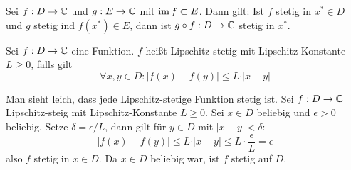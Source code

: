 \begin{satz}
    Sei $f:D\to \mathbb{C}$ und $g:E\to \mathbb{C}$ mit $\operatorname{im} f \subset E$. Dann gilt: Ist $f$ stetig in $x^*\in D$ und $g$ stetig ind $f(x^*)\in E$, dann ist $g\circ f:D\to \mathbb{C}$ stetig in $x^*$.
\end{satz}
\begin{defn}
    Sei $f:D\to \mathbb{C}$ eine Funktion. $f$ heißt Lipschitz-stetig mit Lipschitz-Konstante $L\ge 0$, falls gilt
    \[
    \forall x,y\in D: \vert f(x)-f(y)\vert \le L\cdot \vert x-y\vert    
    \]
\end{defn}
\begin{bem}
    Man sieht leich, dass jede Lipschitz-stetige Funktion stetig ist. Sei $f:D\to \mathbb{C}$ Lipschitz-steig mit Lipschitz-Konstante $L\ge 0$. Sei $x\in D$ beliebig und $\epsilon>0$ beliebig. Setze $\delta = \epsilon/L$, dann gilt für $y\in D$ mit $\vert x-y\vert<\delta$:
    \[
    \vert f(x)-f(y)\vert \le L \cdot \vert x-y\vert \le  L\cdot \frac{\epsilon}{L}=\epsilon
    \]
    also $f$ stetig in $x\in D$. Da $x\in D$ beliebig war, ist $f$ stetig auf $D$.
\end{bem}